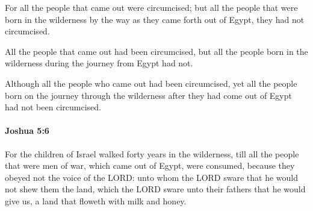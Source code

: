 			\begin{versebox}
					\item[BHS] 
					\item[ASV] For all the people that came out were circumcised; but all the people that were born in the wilderness by the way as they came forth out of Egypt, they had not circumcised.
					\item[NIV] All the people that came out had been circumcised, but all the people born in the wilderness during the journey from Egypt had not.
					\item[NRSV] Although all the people who came out had been circumcised, yet all the people born on the journey through the wilderness after they had come out of Egypt had not been circumcised.
			\end{versebox}

		\paragraph{Joshua 5:6} %
			\label{JOSHUA-5-6}

			For the children of Israel walked forty years in the wilderness, till all the people that were men of war, which came out of Egypt, were consumed, because they obeyed not the voice of the LORD: unto whom the LORD sware that he would not shew them the land, which the LORD sware unto their fathers that he would give us, a land that floweth with milk and honey.

